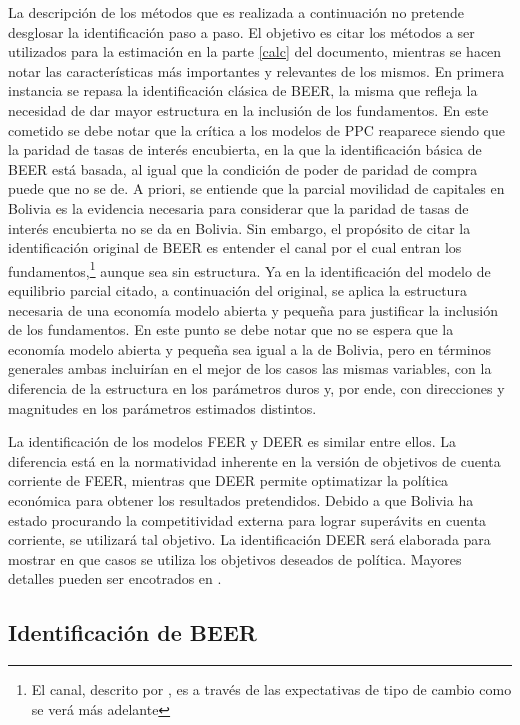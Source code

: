 \documentclass[12pt,letterpaper]{article}
\begin{document}
La descripción de los métodos  que es realizada a continuación no pretende desglosar la identificación paso a paso. El objetivo es citar los métodos a ser utilizados para la estimación en la parte \ref{calc} del documento, mientras se hacen notar las características más importantes y relevantes de los mismos. En primera instancia se repasa la identificación clásica de BEER, la misma que refleja la necesidad de dar mayor estructura en la inclusión de los fundamentos. En este cometido se debe notar que la crítica a los modelos de PPC reaparece siendo que la paridad de tasas de interés encubierta, en la que la identificación básica de BEER está basada, al igual que la condición de poder de paridad de compra puede que no se de. A priori, se entiende que la parcial movilidad de capitales  en Bolivia es la evidencia necesaria para considerar que la paridad de tasas de interés encubierta no se da en Bolivia. Sin embargo, el propósito de citar la identificación original de BEER es entender el canal por el cual entran los fundamentos,\footnote{El canal, descrito por \cite{clark1999exchange}, es a través de las expectativas de tipo de cambio como se verá más adelante} aunque sea sin estructura. Ya en la identificación del modelo de equilibrio parcial citado, a continuación del original, se aplica la estructura necesaria de una economía modelo abierta y pequeña para justificar la inclusión de los fundamentos. En este punto se debe notar que no se espera que la economía modelo abierta y pequeña sea igual a la de Bolivia, pero en términos generales ambas incluirían en el mejor de los casos las mismas variables, con la diferencia de la estructura en los parámetros duros y, por ende, con direcciones y magnitudes en los parámetros estimados distintos.

La identificación de los modelos FEER y DEER es similar entre ellos. La diferencia está en la normatividad inherente en la versión de objetivos de cuenta corriente de FEER, mientras que DEER permite optimatizar la política económica para obtener los resultados pretendidos. Debido a que Bolivia ha estado procurando la competitividad externa para lograr superávits en cuenta corriente, se utilizará tal objetivo. La identificación DEER será elaborada para mostrar en que casos se utiliza los objetivos deseados de política. Mayores detalles pueden ser encotrados en \cite{james2012handbook}.		

\subsection*{Identificación de BEER}
\end{document}

